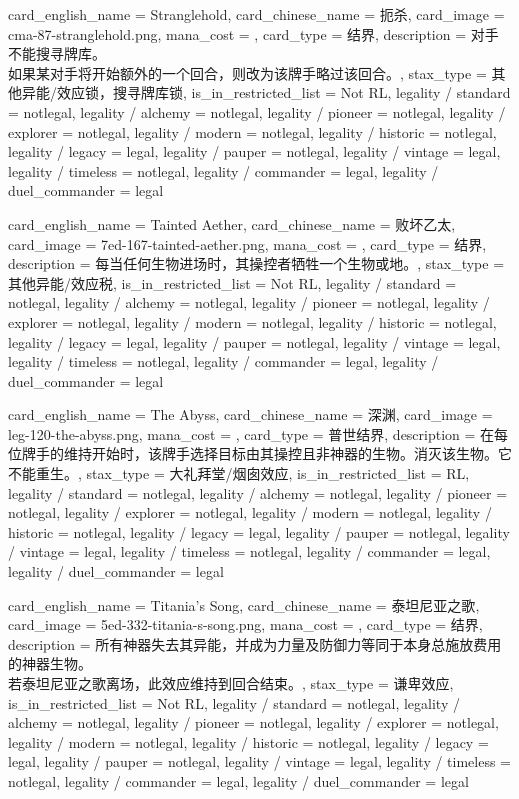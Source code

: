 \documentclass[lang = cn, color = black, 10pt]{AllThatStax}
\begin{document}
\card
{
	card_english_name = {Stranglehold},
	card_chinese_name = {扼杀},
	card_image = cma-87-stranglehold.png,
	mana_cost = ,
	card_type = 结界,
	description = {对手不能搜寻牌库。\\
如果某对手将开始额外的一个回合，则改为该牌手略过该回合。},
	stax_type = 其他异能/效应锁，搜寻牌库锁,
	is_in_restricted_list = Not RL,
	legality / standard = notlegal,
	legality / alchemy = notlegal,
	legality / pioneer = notlegal,
	legality / explorer = notlegal,
	legality / modern = notlegal,
	legality / historic = notlegal,
	legality / legacy = legal,
	legality / pauper = notlegal,
	legality / vintage = legal,
	legality / timeless = notlegal,
	legality / commander = legal,
	legality / duel_commander = legal
}

\card
{
	card_english_name = {Tainted Aether},
	card_chinese_name = {败坏乙太},
	card_image = 7ed-167-tainted-aether.png,
	mana_cost = ,
	card_type = 结界,
	description = {每当任何生物进场时，其操控者牺牲一个生物或地。},
	stax_type = 其他异能/效应税,
	is_in_restricted_list = Not RL,
	legality / standard = notlegal,
	legality / alchemy = notlegal,
	legality / pioneer = notlegal,
	legality / explorer = notlegal,
	legality / modern = notlegal,
	legality / historic = notlegal,
	legality / legacy = legal,
	legality / pauper = notlegal,
	legality / vintage = legal,
	legality / timeless = notlegal,
	legality / commander = legal,
	legality / duel_commander = legal
}

\card
{
	card_english_name = {The Abyss},
	card_chinese_name = {深渊},
	card_image = leg-120-the-abyss.png,
	mana_cost = ,
	card_type = 普世结界,
	description = {在每位牌手的维持开始时，该牌手选择目标由其操控且非神器的生物。消灭该生物。它不能重生。},
	stax_type = 大礼拜堂/烟囱效应,
	is_in_restricted_list = RL,
	legality / standard = notlegal,
	legality / alchemy = notlegal,
	legality / pioneer = notlegal,
	legality / explorer = notlegal,
	legality / modern = notlegal,
	legality / historic = notlegal,
	legality / legacy = legal,
	legality / pauper = notlegal,
	legality / vintage = legal,
	legality / timeless = notlegal,
	legality / commander = legal,
	legality / duel_commander = legal
}

\card
{
	card_english_name = {Titania's Song},
	card_chinese_name = {泰坦尼亚之歌},
	card_image = 5ed-332-titania-s-song.png,
	mana_cost = ,
	card_type = 结界,
	description = {所有神器失去其异能，并成为力量及防御力等同于本身总施放费用的神器生物。\\
若泰坦尼亚之歌离场，此效应维持到回合结束。},
	stax_type = 谦卑效应,
	is_in_restricted_list = Not RL,
	legality / standard = notlegal,
	legality / alchemy = notlegal,
	legality / pioneer = notlegal,
	legality / explorer = notlegal,
	legality / modern = notlegal,
	legality / historic = notlegal,
	legality / legacy = legal,
	legality / pauper = notlegal,
	legality / vintage = legal,
	legality / timeless = notlegal,
	legality / commander = legal,
	legality / duel_commander = legal
}
\end{document}
